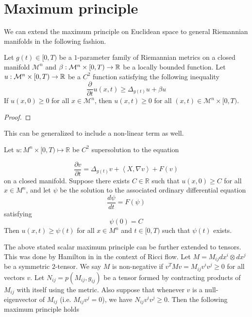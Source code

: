 \section{Maximum principle}\label{max}
We can extend the maximum principle on Euclidean space to general Riemannian manifolds in the following fashion. 
\begin{lemma}
    Let $ g(t) \in [0,T) $ be a $ 1 $-parameter family of Riemannian metrics on a closed manifold $ \mathcal{M}^{n} $ and $ \beta : \mathcal{M}^{n} \times [0,T) \to \mathbb{R} $ be a locally bounded function. Let $ u : \mathcal{M}^{n} \times [0,T) \to \mathbb{R}$ be a $ C^{2} $ function satisfying the following inequality 
    \[ \frac{ \partial}{ \partial t}u(x,t) \ge \Delta_{g(t)}u + \beta u\]
    If $ u(x,0) \ge 0 $ for all $ x \in \mathcal{M}^{n}$, then $ u(x,t) \ge 0 $ for all $ (x,t) \in \mathcal{M}^{n} \times [0,T) $.
\end{lemma}

\begin{proof}
    
\end{proof}

This can be generalized to include a non-linear term as well. \begin{lemma}
 Let $u: M^n \times[0, T) \mapsto \mathbb{R}$ be $C^2$ supersolution to the equation 
 
 \[ \frac{\partial v}{\partial t} = \Delta_{g(t)}v + \left< X, \nabla v \right> + F(v)\]
  on a closed manifold. Suppose there exists $C \in \mathbb{R}$ such that $u(x, 0) \geq C$ for all $x \in M^n$, and let $\psi$ be the solution to the associated ordinary differential equation
$$
\frac{d \psi}{d t}=F(\psi)
$$
satisfying
$$
\psi(0)=C
$$
Then $u(x, t) \geq \psi(t)$ for all $x \in M^n$ and $t \in[0, T)$ such that $\psi(t)$ exists.
\end{lemma}

The above stated scalar maximum principle can be further extended to tensors. This was done by Hamilton in \cite{hamilton1982three} in the context of Ricci flow. Let $ M = M_{ij}dx^{i}\otimes dx^{j} $ be a symmetric $ 2 $-tensor. We say $ M $ is non-negative if $ v^{T}Mv = M_{ij}v^{i}v^{j} \ge 0 $ for all vectors $ v $. Let $ N_{ij} = p(M_{ij},g_{ij}) $ be a tensor formed by contracting products of $ M_{ij} $ with itself using the metric. Also suppose that whenever $ v $ is a null-eigenvector of $ M_{ij} $ (i.e. $ M_{ij}v^{j} = 0 $), we have $ N_{ij}v^{i}v^{j} \ge 0 $. Then the following maximum principle holds

